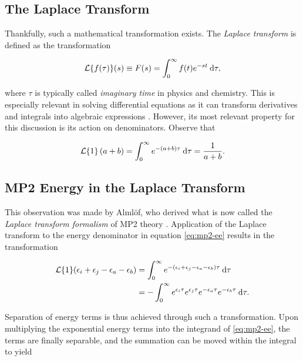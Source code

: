 \subsection{The Laplace Transform}

Thankfully, such a mathematical transformation exists. The \emph{Laplace
transform} is defined as the transformation

\begin{equation}
	\mathcal{L}\{ f(\tau) \}(s) \equiv F(s) = \int_0^{\infty} f(t) e^{-st} \:\mathrm{d} \tau,
\end{equation}

\noindent where $\tau$ is typically called \emph{imaginary time} in physics and
chemistry. This is especially relevant in solving differential equations as it
can transform derivatives and integrals into algebraic expressions
\cite{laplace}. However, its most relevant property for this discussion is its
action on denominators. Observe that

\begin{equation}
	\mathcal{L}\{ 1 \}\left( a + b \right) = \int_0^{\infty}e^{-(a + b)\tau} \:\mathrm{d} \tau = \frac{1}{a + b}.
\end{equation}

\subsection{MP2 Energy in the Laplace Transform}

This observation was made by Alml{\"o}f, who derived what is now called the
\emph{Laplace transform formalism} of MP2 theory \cite{almlof1, almlof2,
almlof3}. Application of the Laplace transform to the energy denominator
in equation \ref{eq:mp2-ee} results in the transformation

\begin{equation}
\begin{split}
\mathcal{L}\{1\}(\epsilon_i + \epsilon_j - \epsilon_a - \epsilon_b) &= \int_0^\infty e^{-(\epsilon_i + \epsilon_j - \epsilon_a - \epsilon_b)\tau} \:\mathrm{d} \tau \\
						    &= - \int_0^\infty e^{\epsilon_i\tau}e^{\epsilon_j\tau}e^{-\epsilon_a\tau}e^{-\epsilon_b\tau} \:\mathrm{d} \tau.
\end{split}
\end{equation}

\noindent Separation of energy terms is thus achieved through such a
transformation. Upon multiplying the exponential energy terms into the integrand
of \ref{eq:mp2-ee}, the terms are finally separable, and the summation can be
moved within the integral to yield

